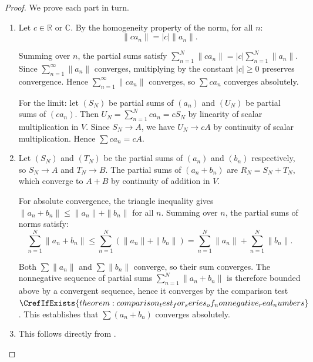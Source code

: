 \begin{proof}
    We prove each part in turn.

    \begin{enumerate}
        \item Let $c \in \mathbb{R}$ or $\mathbb{C}$. By the homogeneity property of the norm, for all $n$:
            $$\|c a_n\| = |c| \|a_n\|.$$

            Summing over $n$, the partial sums satisfy $\sum_{n=1}^N \|c a_n\| = |c| \sum_{n=1}^N \|a_n\|$. Since $\sum_{n=1}^\infty \|a_n\|$ converges, multiplying by the constant $|c| \geq 0$ preserves convergence. Hence $\sum_{n=1}^\infty \|c a_n\|$ converges, so $\sum c a_n$ converges absolutely.

            For the limit: let $(S_N)$ be partial sums of $(a_n)$ and $(U_N)$ be partial sums of $(c a_n)$. Then $U_N = \sum_{n=1}^N c a_n = c S_N$ by linearity of scalar multiplication in $V$. Since $S_N \to A$, we have $U_N \to cA$ by continuity of scalar multiplication. Hence $\sum c a_n = cA$.

        \item Let $(S_N)$ and $(T_N)$ be the partial sums of $(a_n)$ and $(b_n)$ respectively, so $S_N \to A$ and $T_N \to B$. The partial sums of $(a_n + b_n)$ are $R_N = S_N + T_N$, which converge to $A + B$ by continuity of addition in $V$.

            For absolute convergence, the triangle inequality gives $\|a_n + b_n\| \leq \|a_n\| + \|b_n\|$ for all $n$. Summing over $n$, the partial sums of norms satisfy:
            $$\sum_{n=1}^N \|a_n + b_n\| \leq \sum_{n=1}^N (\|a_n\| + \|b_n\|) = \sum_{n=1}^N \|a_n\| + \sum_{n=1}^N \|b_n\|.$$

            Both $\sum \|a_n\|$ and $\sum \|b_n\|$ converge, so their sum converges. The nonnegative sequence of partial sums $\sum_{n=1}^N \|a_n + b_n\|$ is therefore bounded above by a convergent sequence, hence it converges by the comparison test$\CrefIfExists{theorem:comparison_test_for_series_of_nonnegative_real_numbers}$. This establishes that $\sum (a_n + b_n)$ converges absolutely.

        \item This follows directly from .
    \end{enumerate}
\end{proof}

